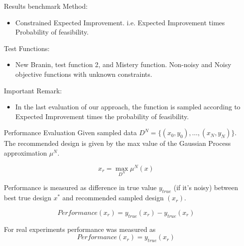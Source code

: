 \documentclass{beamer}
\begin{document}
\begin{frame}{Results}
benchmark Method:
\begin{itemize}
	\item Constrained Expected Improvement. i.e. Expected Improvement times Probability of feasibility. 
\end{itemize}
Test Functions:
\begin{itemize}
	\item New Branin, test function 2, and Mistery function. Non-noisy and Noisy objective functions with unknown constraints.
\end{itemize}

Important Remark:
\begin{itemize}
	\item In the last evaluation of our approach, the function is sampled according to Expected Improvement times the probability of feasibility.
\end{itemize}

\end{frame}

\begin{frame}{Performance Evaluation}
Given sampled data $D^{N} = \{(x_{0},y_{0}),\dots, (x_{N},y_{N}) \}$. The recommended design is given by the max value of the Gaussian Process approximation $\mu^{N}$.

$$
x_{r} = \max_{D^{N}}\mu^{N}(x)
$$


Performance is measured as difference in true value $y_{true}$ (if it's noisy) between best true design $x^{*}$ and recommended sampled design $(x_{r})$.

$$
Performance(x_{r}) = y_{true}(x_{r}) - y_{true}(x_{r}) 
$$

For real experiments performance was measured as
$$
Performance(x_{r}) = y_{true}(x_{r}) 
$$

\end{frame}
\end{document}
